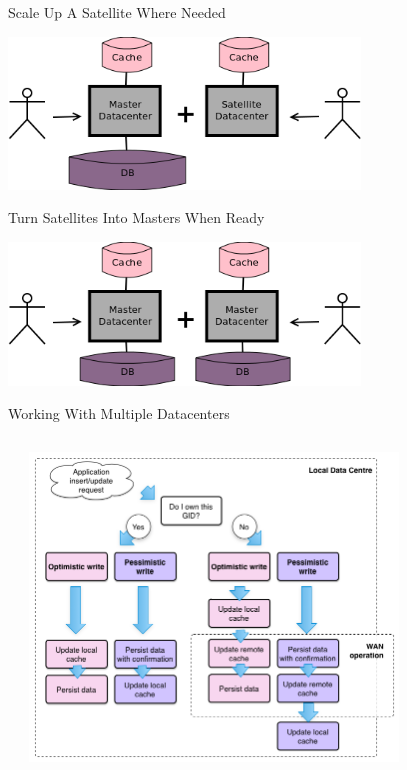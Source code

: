 \documentclass[aspectratio=43]{beamer}
\begin{document}
\begin{frame}{Scale Up A Satellite Where Needed}
    \begin{center}
        \includegraphics[width=0.7\textwidth]{images/scalingdcs2.png}
    \end{center}
\end{frame}

\begin{frame}{Turn Satellites Into Masters When Ready}
    \begin{center}
        \includegraphics[width=0.7\textwidth]{images/scalingdcs3.png}
    \end{center}
\end{frame}

\begin{frame}{Working With Multiple Datacenters}
    \begin{columns}
        \begin{column}[c]{0.1\textwidth}
        \end{column}
        \begin{column}[c]{0.8\textwidth}
            \includegraphics[width=0.8\textwidth]{images/multidcops.png}
        \end{column}
        \begin{column}[c]{0.1\textwidth}
        \end{column}
    \end{columns}
\end{frame}
\end{document}
